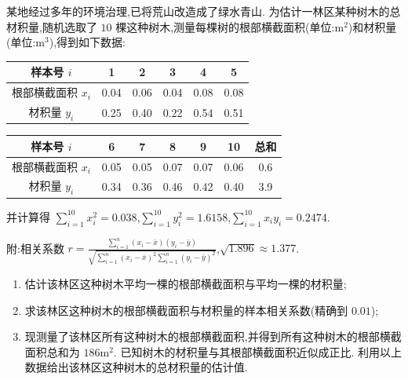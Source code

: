 \begin{problem}
某地经过多年的环境治理,已将荒山改造成了绿水青山. 为估计一林区某种树木的总材积量,随机选取了 \(10\) 棵这种树木,测量每棵树的根部横截面积(单位:\( \mathrm{m}^2 \))和材积量(单位:\( \mathrm{m}^3 \)),得到如下数据:

\begin{center}
\renewcommand{\arraystretch}{1.3}
\begin{tabular}{|c|c|c|c|c|c|}
\hline
样本号 \(i\) & 1 & 2 & 3 & 4 & 5 \\
\hline
根部横截面积 \(x_i\) & 0.04 & 0.06 & 0.04 & 0.08 & 0.08 \\
\hline
材积量 \(y_i\) & 0.25 & 0.40 & 0.22 & 0.54 & 0.51 \\
\hline
\end{tabular}
\end{center}

\begin{center}
\renewcommand{\arraystretch}{1.3}
\begin{tabular}{|c|c|c|c|c|c|c|}
\hline
样本号 \(i\) & 6 & 7 & 8 & 9 & 10 & 总和 \\
\hline
根部横截面积 \(x_i\) & 0.05 & 0.05 & 0.07 & 0.07 & 0.06 & 0.6 \\
\hline
材积量 \(y_i\) & 0.34 & 0.36 & 0.46 & 0.42 & 0.40 & 3.9 \\
\hline
\end{tabular}
\end{center}

并计算得 \( \sum_{i=1}^{10}x_i^2=0.038 \),\( \sum_{i=1}^{10}y_i^2=1.6158 \),\( \sum_{i=1}^{10}x_iy_i=0.2474 \).

附:相关系数 \( r=\frac{\sum_{i=1}^{n}\left( x_i-\bar{x} \right)\left( y_i-\bar{y} \right)}{\sqrt{\sum_{i=1}^{n}\left( x_i-\bar{x} \right)^2\sum_{i=1}^{n}\left( y_i-\bar{y} \right)^2}} \),\( \sqrt{1.896}\approx1.377 \).

\begin{enumerate}
\item 估计该林区这种树木平均一棵的根部横截面积与平均一棵的材积量;
\item 求该林区这种树木的根部横截面积与材积量的样本相关系数(精确到 \(0.01\));
\item 现测量了该林区所有这种树木的根部横截面积,并得到所有这种树木的根部横截面积总和为 \(186\mathrm{m}^2\). 已知树木的材积量与其根部横截面积近似成正比. 利用以上数据给出该林区这种树木的总材积量的估计值.
\end{enumerate}
\end{problem}

